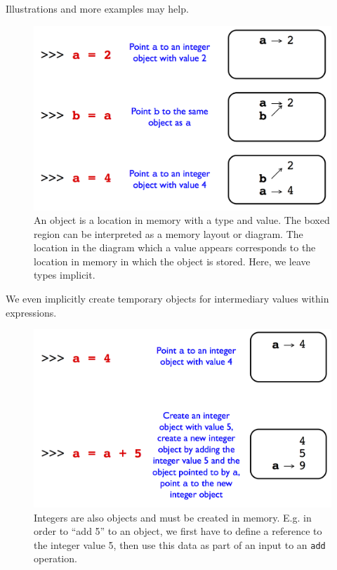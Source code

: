 \documentclass[12pt,letterpaper,twoside]{article}
\begin{document}
Illustrations and more examples may help.

\begin{figure}[h]
\centering
\includegraphics[scale=0.35]{fig/references-example.png}
\caption{\small An object is a location in memory with a type and value. The boxed region can be interpreted as a memory layout or diagram.
The location in the diagram which a value appears corresponds to the location in memory in which the object is stored. Here, we leave types implicit.}
\end{figure}

We even implicitly create temporary objects for intermediary values within expressions.

\begin{figure}[h]
\centering
\includegraphics[scale=0.3]{fig/references-example-2.png}
\caption{\small Integers are also objects and must be created in memory. E.g. in order to ``add 5'' to an object, 
we first have to define a reference to the integer value 5, then use this data as part of an input to an \texttt{add} operation.}
\end{figure}
\end{document}

